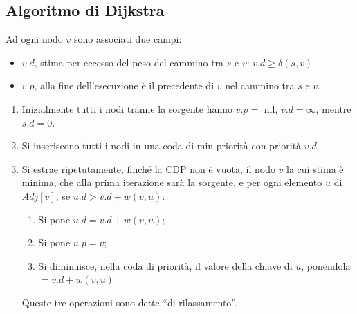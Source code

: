 \documentclass[a4paper,10pt]{article}
\theoremstyle{definition}
\begin{document}
\subsection{Algoritmo di Dijkstra}
Ad ogni nodo $v$ sono associati due campi: 
\begin{itemize}
 \item $v.d$, stima per eccesso del peso del cammino tra $s$ e $v$: \hspace{2mm} $v.d \geq \delta(s, v)$
 \item $v.p$, alla fine dell'esecuzione è il precedente di $v$ nel cammino tra $s$ e $v$.
\end{itemize}
\begin{enumerate}
 \item Inizialmente tutti i nodi tranne la sorgente hanno $v.p =$ nil, $v.d = \infty$, mentre $s.d = 0$.

\item Si inseriscono tutti i nodi in una coda di min-priorità con priorità $v.d$.

\item Si estrae ripetutamente, finché la CDP non è vuota, il nodo $v$ la cui stima è minima, che alla prima iterazione sarà la sorgente, e per ogni elemento $u$ di $Adj[v]$, se $u.d > v.d + w(v, u)$:
\begin{enumerate}
 \item Si pone $u.d = v.d + w(v, u)$;
 \item Si pone $u.p = v$;
 \item Si diminuisce, nella coda di priorità, il valore della chiave di $u$, ponendola $=v.d + w(v, u)$ 
\end{enumerate}
Queste tre operazioni sono dette ``di rilassamento''.

\end{enumerate}
\end{document}

